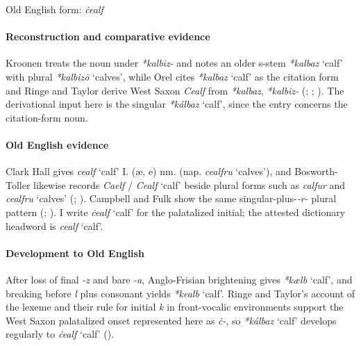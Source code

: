 \documentclass[
  british,
  a4paper,
]{article}
\providecommand{\Recon}[1]{\emph{*#1}}
\begin{document}
Old English form: \emph{ċealf}

\paragraph{Reconstruction and comparative
evidence}\label{reconstruction-and-comparative-evidence-12}

Kroonen treats the noun under \emph{*kalbiz-} and notes an older s-stem
\Recon{kalbaz} `calf' with plural \Recon{kalbizō} `calves', while Orel
cites \Recon{kalbaz} `calf' as the citation form and Ringe and Taylor
derive West Saxon \emph{Cealf} from \emph{*kalbaz}, \emph{*kalbiz-}
(; ; ).
The derivational input here is the singular \Recon{kálbaz} `calf', since
the entry concerns the citation-form noun.

\paragraph{Old English evidence}\label{old-english-evidence-12}

Clark Hall gives {\emph{cealf}} `calf' I. (æ, e) nm. (nap.
{\emph{cealfru}} `calves'), and Bosworth-Toller likewise records
\emph{Caelf} / \emph{Cealf} `calf' beside plural forms such as
\emph{calfur} and {\emph{cealfru}} `calves'
(;
).
Campbell and Fulk show the same singular-plus-\emph{-r-} plural pattern
(;
). I write \emph{ċealf} `calf'
for the palatalized initial; the attested dictionary headword is
{\emph{cealf}} `calf'.

\paragraph{Development to Old
English}\label{development-to-old-english-12}

After loss of final \emph{-z} and bare \emph{-a}, Anglo-Frisian
brightening gives \Recon{kælb} `calf', and breaking before \emph{l} plus
consonant yields \Recon{kealb} `calf'. Ringe and Taylor's account of the
lexeme and their rule for initial \emph{k} in front-vocalic environments
support the West Saxon palatalized onset represented here as \emph{ċ-},
so \Recon{kálbaz} `calf' develops regularly to \emph{ċealf} `calf'
().
\end{document}
